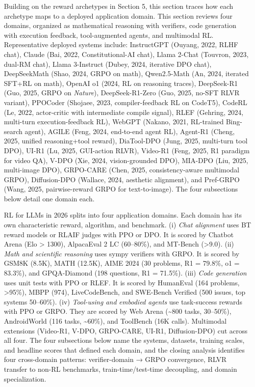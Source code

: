 Building on the reward archetypes in Section 5, this section traces how each archetype maps to a deployed application domain. This section reviews four domains, organized as mathematical reasoning with verifiers, code generation with execution feedback, tool-augmented agents, and multimodal RL. Representative deployed systems include: InstructGPT (Ouyang, 2022, RLHF chat), Claude (Bai, 2022, Constitutional-AI chat), Llama 2-Chat (Touvron, 2023, dual-RM chat), Llama 3-Instruct (Dubey, 2024, iterative DPO chat), DeepSeekMath (Shao, 2024, GRPO on math), Qwen2.5-Math (An, 2024, iterated SFT+RL on math), OpenAI o1 (2024, RL on reasoning traces), DeepSeek-R1 (Guo, 2025, GRPO on \emph{Nature}), DeepSeek-R1-Zero (Guo, 2025, no-SFT RLVR variant), PPOCoder (Shojaee, 2023, compiler-feedback RL on CodeT5), CodeRL (Le, 2022, actor-critic with intermediate compile signal), RLEF (Gehring, 2024, multi-turn execution-feedback RL), WebGPT (Nakano, 2021, RL-trained Bing-search agent), AGILE (Feng, 2024, end-to-end agent RL), Agent-R1 (Cheng, 2025, unified reasoning+tool reward), DiaTool-DPO (Jung, 2025, multi-turn tool DPO), UI-R1 (Lu, 2025, GUI-action RLVR), Video-R1 (Feng, 2025, R1 paradigm for video QA), V-DPO (Xie, 2024, vision-grounded DPO), MIA-DPO (Liu, 2025, multi-image DPO), GRPO-CARE (Chen, 2025, consistency-aware multimodal GRPO), Diffusion-DPO (Wallace, 2024, aesthetic alignment), and Pref-GRPO (Wang, 2025, pairwise-reward GRPO for text-to-image). The four subsections below detail one domain each.

RL for LLMs in 2026 splits into four application domains. Each domain has its own characteristic reward, algorithm, and benchmark. (i) \emph{Chat alignment} uses BT reward models or RLAIF judges with PPO or DPO. It is scored by Chatbot Arena (Elo \textgreater{} 1300), AlpacaEval 2 LC (60--80\%), and MT-Bench (\textgreater9.0). (ii) \emph{Math and scientific reasoning} uses sympy verifiers with GRPO. It is scored by GSM8K (8.5K), MATH (12.5K), AIME 2024 (30 problems, R1 = 79.8\%, o1 = 83.3\%), and GPQA-Diamond (198 questions, R1 = 71.5\%). (iii) \emph{Code generation} uses unit tests with PPO or RLEF. It is scored by HumanEval (164 problems, \textgreater95\%), MBPP (974), LiveCodeBench, and SWE-Bench Verified (500 issues, top systems 50--60\%). (iv) \emph{Tool-using and embodied agents} use task-success rewards with PPO or GRPO. They are scored by Web Arena (\textasciitilde800 tasks, 30--50\%), AndroidWorld (116 tasks, \textasciitilde60\%), and ToolBench (16K calls). Multimodal extensions (Video-R1, V-DPO, GRPO-CARE, UI-R1, Diffusion-DPO) cut across all four. The four subsections below name the systems, datasets, training scales, and headline scores that defined each domain, and the closing analysis identifies four cross-domain patterns: verifier-domain → GRPO convergence, RLVR transfer to non-RL benchmarks, train-time/test-time decoupling, and domain specialization.

